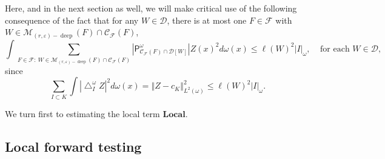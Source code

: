 \documentclass{amsart}%
\theoremstyle{plain}
\numberwithin{equation}{section}
\begin{document}
Here, and in the next section as well, we will make critical use of the
following consequence of the fact that for any $W\in\mathcal{D}$, there is at
most one $F\in\mathcal{F}$ with $W\in\mathcal{M}_{\left(  r,\varepsilon
\right)  -\operatorname*{deep}}\left(  F\right)  \cap\mathcal{C}_{\mathcal{F}%
}\left(  F\right)  $,%
\begin{equation}
\int\sum_{F\in\mathcal{F}:\ W\in\mathcal{M}_{\left(  r,\varepsilon\right)
-\operatorname*{deep}}\left(  F\right)  \cap\mathcal{C}_{\mathcal{F}}\left(
F\right)  }\left\vert \mathsf{P}_{\mathcal{C}_{\mathcal{F}}\left(  F\right)
\cap\mathcal{D}\left[  W\right]  }^{\omega}\right\vert Z\left(  x\right)
^{2}d\omega\left(  x\right)  \leq\ell\left(  W\right)  ^{2}\left\vert
I\right\vert _{\omega},\ \ \ \ \ \text{for each }W\in\mathcal{D}%
,\label{overlap}%
\end{equation}
since
\[
\sum_{I\subset K}\int\left\vert \bigtriangleup_{I}^{\omega}Z\right\vert
^{2}d\omega\left(  x\right)  =\left\Vert Z-c_{K}\right\Vert _{L^{2}\left(
\omega\right)  }^{2}\leq\ell\left(  W\right)  ^{2}\left\vert I\right\vert
_{\omega}.
\]


We turn first to estimating the local term $\mathbf{Local}$.

\subsection{Local forward testing}
\end{document}
